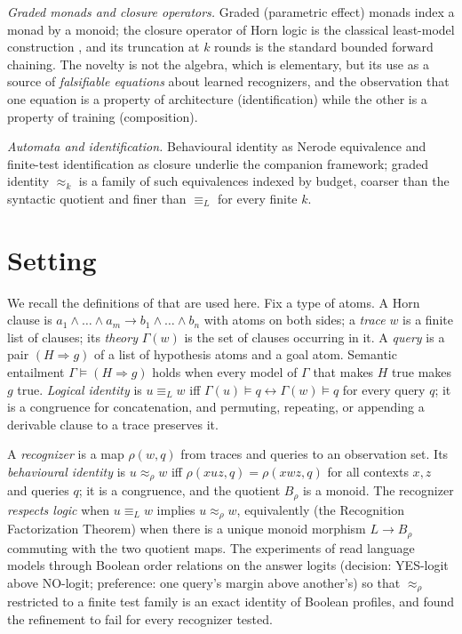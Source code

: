 \emph{Graded monads and closure operators.} Graded (parametric effect) monads \cite{smirnov2008,fujii2016,katsumata2014parametric} index a monad by a monoid; the closure operator of Horn logic is the classical least-model construction \cite{dowling1984horn}, and its truncation at \(k\) rounds is the standard bounded forward chaining. The novelty is not the algebra, which is elementary, but its use as a source of \emph{falsifiable equations} about learned recognizers, and the observation that one equation is a property of architecture (identification) while the other is a property of training (composition).

\emph{Automata and identification.} Behavioural identity as Nerode equivalence and finite-test identification as closure \cite{nerode1958,angluin1987learning} underlie the companion framework; graded identity \(\approx_k\) is a family of such equivalences indexed by budget, coarser than the syntactic quotient and finer than \(\equiv_L\) for every finite \(k\).

\section{Setting}\label{setting}

We recall the definitions of \cite{rp2026} that are used here. Fix a type of atoms. A Horn clause is \(a_1\wedge\dots\wedge a_m\to b_1\wedge\dots\wedge b_n\) with atoms on both sides; a \emph{trace} \(w\) is a finite list of clauses; its \emph{theory} \(\Gamma(w)\) is the set of clauses occurring in it. A \emph{query} is a pair \((H\Rightarrow g)\) of a list of hypothesis atoms and a goal atom. Semantic entailment \(\Gamma\models(H\Rightarrow g)\) holds when every model of \(\Gamma\) that makes \(H\) true makes \(g\) true. \emph{Logical identity} is \(u\equiv_L w\) iff \(\Gamma(u)\models q\leftrightarrow\Gamma(w)\models q\) for every query \(q\); it is a congruence for concatenation, and permuting, repeating, or appending a derivable clause to a trace preserves it.

A \emph{recognizer} is a map \(\rho(w,q)\) from traces and queries to an observation set. Its \emph{behavioural identity} is \(u\approx_\rho w\) iff \(\rho(xuz,q)=\rho(xwz,q)\) for all contexts \(x,z\) and queries \(q\); it is a congruence, and the quotient \(B_\rho\) is a monoid. The recognizer \emph{respects logic} when \(u\equiv_Lw\) implies \(u\approx_\rho w\), equivalently (the Recognition Factorization Theorem) when there is a unique monoid morphism \(L\to B_\rho\) commuting with the two quotient maps. The experiments of \cite{ppi2026} read language models through Boolean order relations on the answer logits (decision: YES-logit above NO-logit; preference: one query's margin above another's) so that \(\approx_\rho\) restricted to a finite test family is an exact identity of Boolean profiles, and found the refinement to fail for every recognizer tested.

